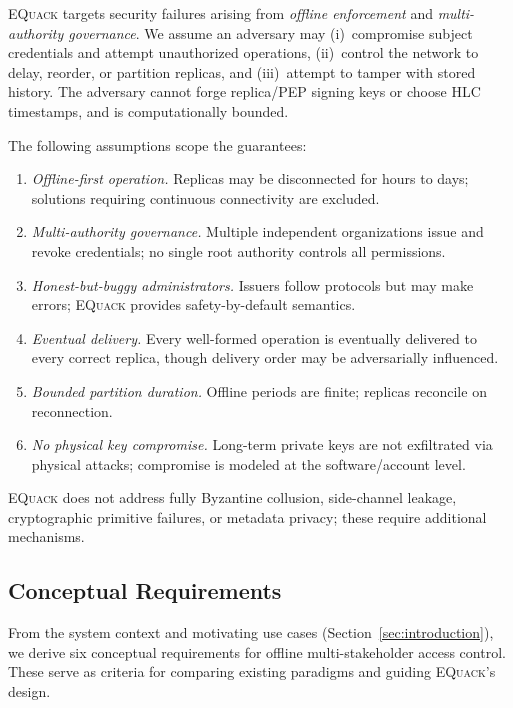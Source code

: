 \documentclass[10pt,journal,compsoc]{IEEEtran}
\newcommand{\equack}{\textsc{EQuack}}
\begin{document}
\equack{} targets security failures arising from \emph{offline enforcement} and \emph{multi-authority governance}. We assume an adversary may (i)~compromise subject credentials and attempt unauthorized operations, (ii)~control the network to delay, reorder, or partition replicas, and (iii)~attempt to tamper with stored history. The adversary cannot forge replica/PEP signing keys or choose HLC timestamps, and is computationally bounded.

The following assumptions scope the guarantees:
\begin{enumerate}
    \item \textit{Offline-first operation.} Replicas may be disconnected for hours to days; solutions requiring continuous connectivity are excluded.
    \item \textit{Multi-authority governance.} Multiple independent organizations issue and revoke credentials; no single root authority controls all permissions.
    \item \textit{Honest-but-buggy administrators.} Issuers follow protocols but may make errors; \equack{} provides safety-by-default semantics.
    \item \textit{Eventual delivery.} Every well-formed operation is eventually delivered to every correct replica, though delivery order may be adversarially influenced.
    \item \textit{Bounded partition duration.} Offline periods are finite; replicas reconcile on reconnection.
    \item \textit{No physical key compromise.} Long-term private keys are not exfiltrated via physical attacks; compromise is modeled at the software/account level.
\end{enumerate}
\equack{} does not address fully Byzantine collusion, side-channel leakage, cryptographic primitive failures, or metadata privacy; these require additional mechanisms.

\subsection{Conceptual Requirements}\label{subsec:conceptual-requirements}

From the system context and motivating use cases (Section~\ref{sec:introduction}), we derive six conceptual requirements for offline multi-stakeholder access control. These serve as criteria for comparing existing paradigms and guiding \equack{}'s design.
\end{document}
